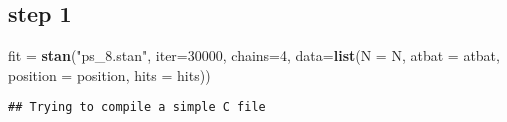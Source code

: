 \documentclass[
]{article}
\newenvironment{Shaded}{\begin{snugshade}}{\end{snugshade}}
\newcommand{\AttributeTok}[1]{\textcolor[rgb]{0.13,0.29,0.53}{#1}}
\newcommand{\DecValTok}[1]{\textcolor[rgb]{0.00,0.00,0.81}{#1}}
\newcommand{\FunctionTok}[1]{\textcolor[rgb]{0.13,0.29,0.53}{\textbf{#1}}}
\newcommand{\NormalTok}[1]{#1}
\newcommand{\OtherTok}[1]{\textcolor[rgb]{0.56,0.35,0.01}{#1}}
\newcommand{\StringTok}[1]{\textcolor[rgb]{0.31,0.60,0.02}{#1}}
\begin{document}
\hypertarget{step-1}{%
\subsection{step 1}\label{step-1}}

\begin{Shaded}
\begin{Highlighting}[]
\NormalTok{fit }\OtherTok{=} \FunctionTok{stan}\NormalTok{(}\StringTok{"ps\_8.stan"}\NormalTok{, }\AttributeTok{iter=}\DecValTok{30000}\NormalTok{, }\AttributeTok{chains=}\DecValTok{4}\NormalTok{, }
           \AttributeTok{data=}\FunctionTok{list}\NormalTok{(}\AttributeTok{N =}\NormalTok{ N, }\AttributeTok{atbat =}\NormalTok{ atbat, }\AttributeTok{position =}\NormalTok{ position, }\AttributeTok{hits =}\NormalTok{ hits))}
\end{Highlighting}
\end{Shaded}

\begin{verbatim}
## Trying to compile a simple C file
\end{verbatim}
\end{document}
